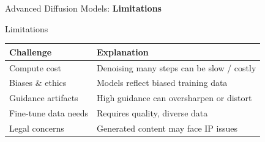 \begin{frame}{}
    \LARGE Advanced Diffusion Models: \textbf{Limitations}
\end{frame}

\begin{frame}{Limitations}
\begin{tabular}{p{3.5cm} p{8cm}}
\textbf{Challenge} & \textbf{Explanation} \\
\hline
Compute cost & Denoising many steps can be slow / costly \\[0.8em]
Biases \& ethics & Models reflect biased training data \\[0.8em]
Guidance artifacts & High guidance can oversharpen or distort \\[0.8em]
Fine-tune data needs & Requires quality, diverse data \\[0.8em]
Legal concerns & Generated content may face IP issues \\
\end{tabular}
\end{frame}